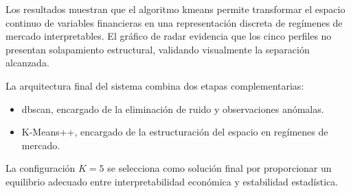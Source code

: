\documentclass[
]{article}
\begin{document}
Los resultados muestran que el algoritmo \gls{kmeans} permite 
transformar el espacio continuo de variables financieras en una 
representación discreta de regímenes de mercado interpretables. El 
gráfico de radar evidencia que los cinco perfiles no presentan 
solapamiento estructural, validando visualmente la separación 
alcanzada.

La arquitectura final del sistema combina dos etapas complementarias:

\begin{itemize}
    \item \gls{dbscan}, encargado de la eliminación de ruido y 
	observaciones anómalas.
    \item K-Means++, encargado de la estructuración del espacio en 
	regímenes de mercado.
\end{itemize}

La configuración $K=5$ se selecciona como solución final por 
proporcionar un equilibrio adecuado entre interpretabilidad económica 
y estabilidad estadística.






\newpage
\printbibliography



\end{document}
